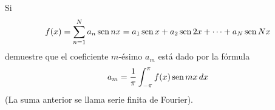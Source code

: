 \item Si 
    \[ f(x) = \sum_{n=1}^{N} a_n \operatorname{sen} nx = a_1 \operatorname{sen} x + a_2 \operatorname{sen} 2x + \dots + a_N \operatorname{sen} Nx \]
    demuestre que el coeficiente $m$-ésimo $a_m$ está dado por la fórmula
    \[ a_m = \frac{1}{\pi} \int_{-\pi}^{\pi} f(x) \operatorname{sen} mx \, dx \]
    (La suma anterior se llama serie finita de Fourier).
